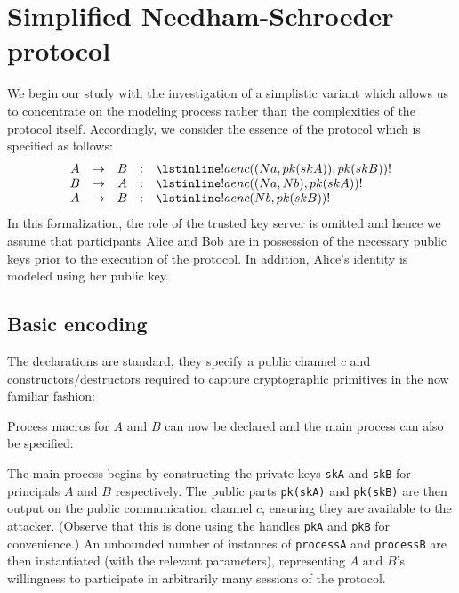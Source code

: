 \documentclass{book}
\newcommand{\A}{A}
\newcommand{\B}{B}
\begin{document}
\section{Simplified Needham-Schroeder protocol}\label{sec:caseStudySimple}

We begin our study with the investigation of a simplistic variant which allows us to concentrate on the modeling process rather than the complexities of the protocol itself. Accordingly, we consider the essence of the protocol which is specified as follows:
\[
\begin{array}{ccccl}
\A &\rightarrow& \B &:& \lstinline!aenc((Na,pk(skA)), pk(skB))! \\
\B &\rightarrow& \A &:& \lstinline!aenc((Na,Nb), pk(skA)) !\\
\A &\rightarrow& \B &:& \lstinline!aenc(Nb, pk(skB)) !
\end{array}
\]
In this formalization, the role of the trusted key server is omitted and hence we assume that participants Alice and Bob are in possession of the necessary public keys prior to the execution of the protocol. In addition, Alice's identity is modeled using her public key.

\subsection{Basic encoding}

The declarations are standard, they specify a public channel $c$ and constructors/destructors required to capture cryptographic primitives in the now familiar fashion:
%

%
Process macros for $\A$ and $\B$ can now be declared and the main process can also be specified:
%

%
The main process begins by constructing the private keys \lstinline!skA! and \lstinline!skB! for principals $\A$ and $\B$ respectively. The public parts \lstinline!pk(skA)! and \lstinline!pk(skB)! are then output on the public communication channel $c$, ensuring they are available to the attacker. (Observe that this is done using the handles \lstinline!pkA! and \lstinline!pkB! for convenience.) An unbounded number of instances of \lstinline!processA! and \lstinline!processB! are then instantiated (with the relevant parameters), representing $\A$ and $\B$'s willingness to participate in arbitrarily many sessions of the protocol.
\end{document}
